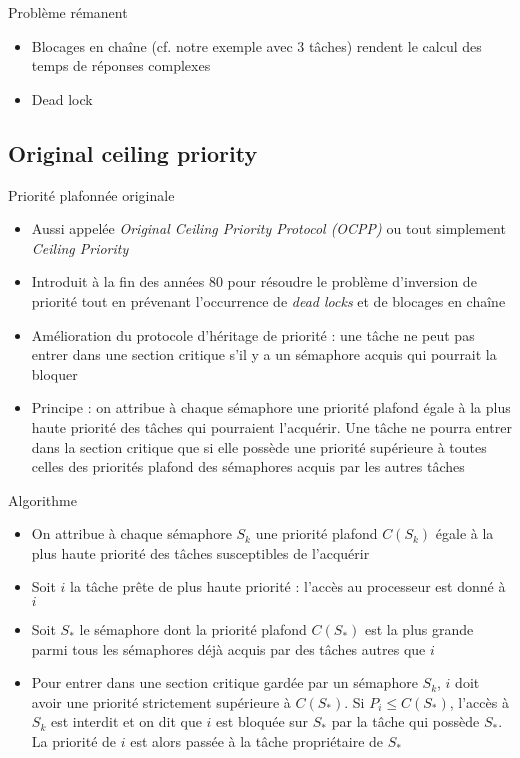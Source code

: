 \begin{frame}{Problème rémanent}
  \begin{itemize}
  \item Blocages en  chaîne (cf. notre exemple avec  3 tâches) rendent
    le calcul des temps de réponses complexes
  \item Dead lock
  \end{itemize}
\end{frame}

\subsection{Original ceiling priority}

\begin{frame}{Priorité plafonnée originale}
  \begin{itemize}
  \item  Aussi  appelée   \emph{Original  Ceiling  Priority  Protocol
      (OCPP)} ou tout simplement \emph{Ceiling Priority}
  \item Introduit  à la  fin des années  80 pour résoudre  le problème
    d'inversion  de   priorité  tout  en   prévenant  l'occurrence  de
    \emph{dead locks} et de blocages en chaîne
  \item Amélioration  du protocole d'héritage de priorité  : une tâche
    ne peut pas entrer dans une section critique s'il y a un sémaphore
    acquis qui pourrait la bloquer
  \item Principe : on attribue à chaque sémaphore une priorité plafond
    égale  à  la  plus   haute  priorité  des  tâches  qui  pourraient
    l'acquérir. Une  tâche ne pourra  entrer dans la  section critique
    que si  elle possède une  priorité supérieure à toutes  celles des
    priorités plafond des sémaphores acquis par les autres tâches
  \end{itemize}
\end{frame}

\begin{frame}{Algorithme}
  \begin{itemize}
  \item  On attribue  à chaque  sémaphore $S_k$  une  priorité plafond
    $C(S_k)$ égale à la plus haute priorité des tâches susceptibles de
    l'acquérir
  \item Soit  $i$ la tâche prête  de plus haute priorité  : l'accès au
    processeur est donné à $i$
  \item Soit $S_*$ le sémaphore  dont la priorité plafond $C(S_*)$ est
    la  plus grande  parmi tous  les  sémaphores déjà  acquis par  des
    tâches autres que $i$
  \item Pour entrer dans une  section critique gardée par un sémaphore
    $S_k$,  $i$  doit  avoir  une priorité  strictement  supérieure  à
    $C(S_*)$. Si  $P_i ≤ C(S_*)$, l'accès  à $S_k$ est  interdit et on
    dit  que  $i$ est  bloquée  sur $S_*$  par  la  tâche qui  possède
    $S_*$. La priorité de $i$  est alors passée à la tâche propriétaire
    de $S_*$
  \end{itemize}
\end{frame}

